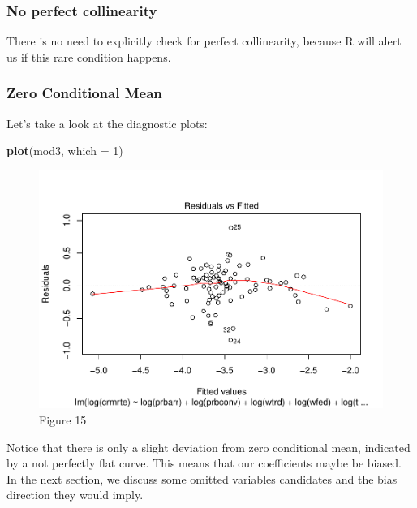 \documentclass[]{article}
\newenvironment{Shaded}{\begin{snugshade}}{\end{snugshade}}
\newcommand{\DataTypeTok}[1]{\textcolor[rgb]{0.13,0.29,0.53}{#1}}
\newcommand{\DecValTok}[1]{\textcolor[rgb]{0.00,0.00,0.81}{#1}}
\newcommand{\KeywordTok}[1]{\textcolor[rgb]{0.13,0.29,0.53}{\textbf{#1}}}
\newcommand{\NormalTok}[1]{#1}
\begin{document}
\hypertarget{no-perfect-collinearity}{%
\subsubsection{No perfect collinearity}\label{no-perfect-collinearity}}

There is no need to explicitly check for perfect collinearity, because R
will alert us if this rare condition happens.

\hypertarget{zero-conditional-mean}{%
\subsubsection{Zero Conditional Mean}\label{zero-conditional-mean}}

Let's take a look at the diagnostic plots:

\begin{Shaded}
\begin{Highlighting}[]
\KeywordTok{plot}\NormalTok{(mod3, }\DataTypeTok{which =} \DecValTok{1}\NormalTok{)}
\end{Highlighting}
\end{Shaded}

\begin{figure}

{\centering \includegraphics{lab_3_v7_files/figure-latex/unnamed-chunk-47-1} 

}

\caption{Figure 15}\label{fig:unnamed-chunk-47}
\end{figure}

Notice that there is only a slight deviation from zero conditional mean,
indicated by a not perfectly flat curve. This means that our
coefficients maybe be biased. In the next section, we discuss some
omitted variables candidates and the bias direction they would imply.
\end{document}
